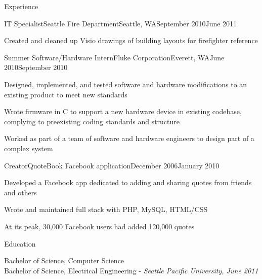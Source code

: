 \documentclass[letterpaper,10pt]{article}
\begin{document}
\begin{res_section}{Experience}
\begin{res_experienceitem}{IT Specialist}{Seattle Fire Department}{Seattle, WA}{September 2010}{June 2011}
  \item Created and cleaned up Visio drawings of building layouts for firefighter reference
\end{res_experienceitem}
\begin{res_experienceitem}{Summer Software/Hardware Intern}{Fluke Corporation}{Everett, WA}{June 2010}{September 2010}
  \item Designed, implemented, and tested software and hardware modifications to an existing product to meet new standards
  \item Wrote firmware in C to support a new hardware device in existing codebase, complying to preexisting coding standards and structure
  \item Worked as part of a team of software and hardware engineers to design part of a complex system
\end{res_experienceitem}
\begin{res_experienceitem}{Creator}{QuoteBook Facebook application}{}{December 2006}{January 2010}
  \item Developed a Facebook app dedicated to adding and sharing quotes from friends and others
  \item Wrote and maintained full stack with PHP, MySQL, HTML/CSS
  \item At its peak, 30,000 Facebook users had added 120,000 quotes
\end{res_experienceitem}
\end{res_section}

\begin{res_section}{Education}
\begin{res_content}{Bachelor of Science, Computer Science\\
Bachelor of Science, Electrical Engineering - \em{Seattle Pacific University, June 2011}
}
\end{res_content}
\end{res_section}
\end{document}
